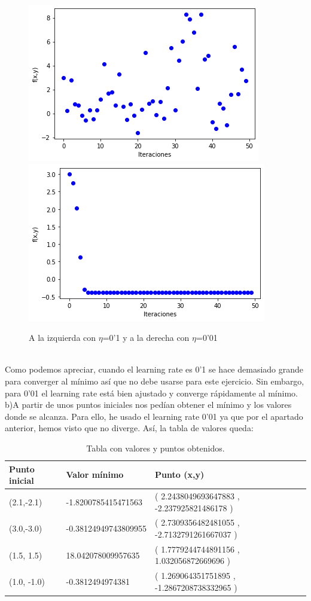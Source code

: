\documentclass[12pt]{article}
\begin{document}
\begin{figure}[h]
\centering
\includegraphics[scale=0.45]{Images/GraficaF01.png} 
\includegraphics[scale=0.45]{Images/GraficaF001.png}
\caption{A la izquierda con $\eta$=0'1 y a la derecha con $\eta$=0'01}
\label{etiqueta}
\end{figure}
\\
Como podemos apreciar, cuando el learning rate es 0'1 se hace demasiado grande para converger al mínimo así que no debe usarse para este ejercicio. Sin embargo, para 0'01 el learning rate está bien ajustado y converge rápidamente al mínimo.
\\
b)A partir de unos puntos iniciales nos pedían obtener el mínimo y los valores donde se alcanza. Para ello, he usado el learning rate 0'01 ya que por el apartado anterior, hemos visto que no diverge. Así, la tabla de valores queda:

\begin{table}[htbp]
\begin{center}
\begin{tabular}{|l|l|l|}
\hline
Punto inicial & Valor mínimo & Punto (x,y)\\
\hline \hline
(2.1,-2.1) & -1.8200785415471563 & ( 2.2438049693647883 ,  -2.237925821486178 ) \\ \hline
(3.0,-3.0) & -0.38124949743809955 & ( 2.7309356482481055 ,  -2.7132791261667037 )\\ \hline
(1.5, 1.5) & 18.042078009957635 & ( 1.7779244744891156 ,  1.032056872669696 ) \\ \hline
(1.0, -1.0) & -0.3812494974381 & ( 1.269064351751895 ,  -1.2867208738332965 ) \\ \hline
\end{tabular}
\caption{Tabla con valores y puntos obtenidos.}
\label{tabla:sencilla}
\end{center}
\end{table}
\end{document}
